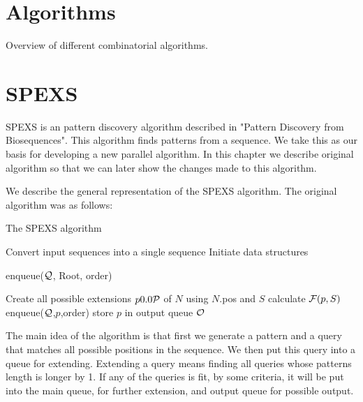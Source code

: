 \section{Algorithms}

Overview of different combinatorial algorithms.

\section{SPEXS}

SPEXS is an pattern discovery algorithm described in "Pattern Discovery from Biosequences"\cite{spexs}. This algorithm finds patterns from a sequence. We take this as our basis for developing a new parallel algorithm. In this chapter we describe original algorithm so that we can later show the changes made to this algorithm.

We describe the general representation of the SPEXS algorithm. 
The original algorithm was as follows:


\begin{algorithm}[H]
	\caption{The SPEXS algorithm}
\begin{algorithmic}[1]

	\State Convert input sequences into a single sequence
	\State Initiate data structures

	\State enqueue($\mathcal{Q}$, Root, order)

		\State Create all possible extensions $p \in \sym{P}$ of $N$ using $N$.pos and $S$
				\State calculate $\mathcal{F}(p,S)$
				\State enqueue($\mathcal{Q}$,$p$,order)
					\State store $p$ in output queue $\mathcal{O}$
				\EndIf
			\EndIf
		\EndFor
	\EndWhile
\end{algorithmic}
\end{algorithm}

The main idea of the algorithm is that first we generate a 
pattern and a query that matches all possible positions in 
the sequence. We then put this query into a queue for extending.
Extending a query means finding all queries whose patterns length
is longer by 1. If any of the queries is fit, by some criteria,
it will be put into the main queue, for further extension, 
and output queue for possible output.


